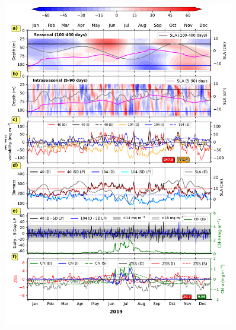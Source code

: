 \documentclass[authoryear,review,11pt]{elsarticle}
\begin{document}
\begin{figure}[htbp]
	\begin{adjustwidth}{-0.5in}{0in} 
		\centering
		\includegraphics[width=0.9\textwidth]{./fig_11_biomass_intra_2019_kollam.pdf} 
		\captionsetup{justification=justified,font=footnotesize,skip=0.05\baselineskip,width=\textwidth}

\end{adjustwidth}
\end{figure}
\end{document}
